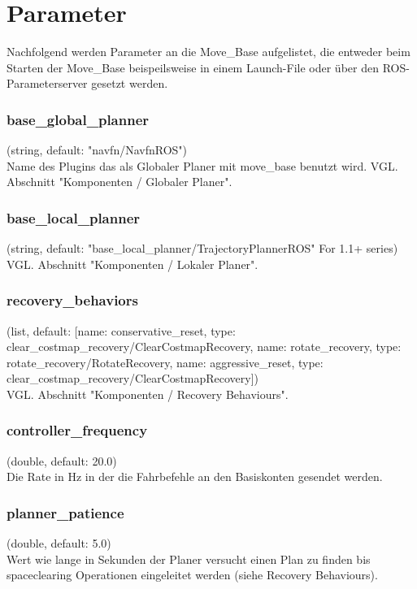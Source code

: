 \documentclass[oribibl]{llncs}
\begin{document}
\section{Parameter}
Nachfolgend werden Parameter an die Move\_Base aufgelistet, die entweder beim Starten der Move\_Base beispeilsweise in einem Launch-File oder über den ROS-Parameterserver gesetzt werden.
\subsubsection{base\_global\_planner} (string, default: "navfn/NavfnROS")\\
   Name des Plugins das als Globaler Planer mit move\_base benutzt wird. VGL. Abschnitt "Komponenten / Globaler Planer".

\subsubsection{base\_local\_planner} (string, default: "base\_local\_planner/TrajectoryPlannerROS" For 1.1+ series)\\
   VGL. Abschnitt "Komponenten / Lokaler Planer".
   
   
\subsubsection{recovery\_behaviors} (list, default: [{name: conservative\_reset, type: clear\_costmap\_recovery/ClearCostmapRecovery}, {name: rotate\_recovery, type: rotate\_recovery/RotateRecovery}, {name: aggressive\_reset, type: clear\_costmap\_recovery/ClearCostmapRecovery}])\\
   VGL. Abschnitt "Komponenten / Recovery Behaviours".
   
\subsubsection{controller\_frequency} (double, default: 20.0)\\
	Die Rate in Hz in der die Fahrbefehle an den Basiskonten gesendet werden.
	
\subsubsection{planner\_patience} (double, default: 5.0)\\
	Wert wie lange in Sekunden der Planer versucht einen Plan zu finden bis spaceclearing Operationen eingeleitet werden (siehe Recovery Behaviours).
	
\end{document}
